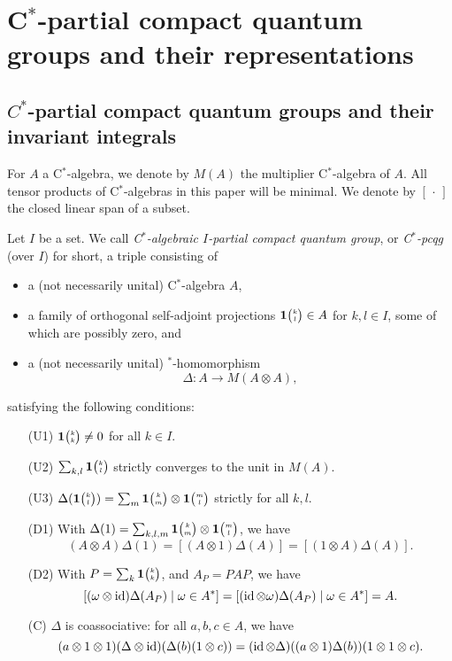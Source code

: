 \section{C$^*$-partial compact quantum groups and their representations}


\subsection{$C^{*}$-partial compact quantum groups and their invariant integrals}

For $A$ a C$^*$-algebra, we denote by $M(A)$ the multiplier C$^*$-algebra of $A$. All tensor products of C$^*$-algebras in this paper will be minimal. We denote by $[\,\cdot\,]$ the closed linear span of a subset.

\begin{Def}\label{DefCpcqg} Let $I$ be a set. We call \emph{C$^*$-algebraic $I$-partial compact quantum group}, or \emph{C$^*$-pcqg} (over $I$) for short, a triple consisting of 
\begin{itemize}
\item a (not necessarily unital) C$^*$-algebra $A$,
\item a family of orthogonal self-adjoint projections $\mathbf{1}{\tiny {\begin{pmatrix} k\\l\end{pmatrix}}}\in A$ for $k,l\in I$, some of which are possibly zero, and
\item  a (not necessarily unital) $^*$-homomorphism \[\Delta: A\rightarrow M(A\otimes A),\] 
\end{itemize}
satisfying the following conditions:
\begin{enumerate}[(a)]
\item[(U1)] $\mathbf{1}{\tiny {\begin{pmatrix} k\\k\end{pmatrix}}}\neq 0$ for all $k\in I$. 
\item[(U2)] $\sum_{k,l} \mathbf{1}{\tiny {\begin{pmatrix} k\\l\end{pmatrix}}}$ strictly converges to the unit in $M(A)$.
\item[(U3)] $\Delta(\mathbf{1}{\tiny {\begin{pmatrix} k\\l\end{pmatrix}}}) = \sum_{m}\mathbf{1}{\tiny {\begin{pmatrix} k\\m\end{pmatrix}}}\otimes \mathbf{1}{\tiny {\begin{pmatrix} m\\l\end{pmatrix}}}$ strictly for all $k,l$. 
\item[(D1)] With $\Delta(1) = \sum_{k,l,m} \mathbf{1}{\tiny {\begin{pmatrix} k\\m\end{pmatrix}}}\otimes \mathbf{1}{\tiny {\begin{pmatrix} m\\l\end{pmatrix}}}$, we have \begin{equation}\label{CondDi}(A\otimes A)\Delta(1) = [(A\otimes 1)\Delta(A)] = [(1\otimes A)\Delta(A)].\end{equation} 
\item[(D2)] With $P=\sum_{k} \mathbf{1}{\tiny {\begin{pmatrix} k\\k\end{pmatrix}}}$, and $A_P = PAP$, we have \[[(\omega\otimes \operatorname{id})\Delta(A_P)\mid \omega \in A^*] = [(\operatorname{id}\otimes \omega)\Delta(A_P)\mid \omega \in A^*] = A.\]
\item[(C)] $\Delta$ is coassociative: for all $a,b,c\in A$, we have \[(a\otimes 1\otimes 1)(\Delta\otimes \operatorname{id})(\Delta(b)(1\otimes c)) = (\operatorname{id}\otimes \Delta)((a\otimes 1)\Delta(b))(1\otimes 1\otimes c).\] 
\end{enumerate}
\end{Def} 

